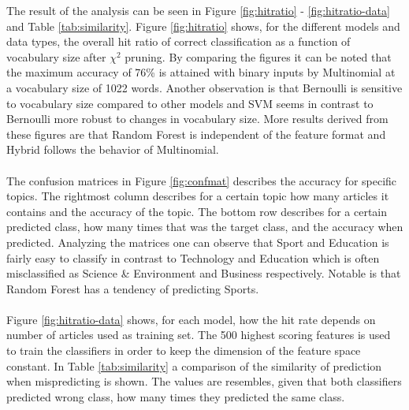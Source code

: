 \label{sec:result}
The result of the analysis can be seen in Figure \ref{fig:hitratio} - \ref{fig:hitratio-data} and Table \ref{tab:similarity}. Figure \ref{fig:hitratio} shows, for the different models and data types, the overall hit ratio of correct classification as a function of vocabulary size after $\chi^2$ pruning. By comparing the figures it can be noted that the maximum accuracy of 76\% is attained with binary inputs by Multinomial at a vocabulary size of 1022 words. Another observation is that Bernoulli is sensitive to vocabulary size compared to other models and SVM seems in contrast to Bernoulli more robust to changes in vocabulary size. More results derived from these figures are that Random Forest is independent of the feature format and Hybrid follows the behavior of Multinomial.\\\\
The confusion matrices in Figure \ref{fig:confmat} describes the accuracy for specific topics. The rightmost column describes for a certain topic how many articles it contains and the accuracy of the topic. The bottom row describes for a certain predicted class, how many times that was the target class, and the accuracy when predicted. Analyzing the matrices one can observe that Sport and Education is fairly easy to classify in contrast to Technology and Education which is often misclassified as Science \& Environment and Business respectively. Notable is that Random Forest has a tendency of predicting Sports.\\\\
Figure \ref{fig:hitratio-data} shows, for each model, how the hit rate depends on number of articles used as training set. The 500 highest scoring features is used to train the classifiers in order to keep the dimension of the feature space constant.
In Table \ref{tab:similarity} a comparison of the similarity of prediction when mispredicting is shown. The values are resembles, given that both classifiers predicted wrong class, how many times they predicted the same class.

\onecolumn

\onecolumn

\onecolumn

\twocolumn
